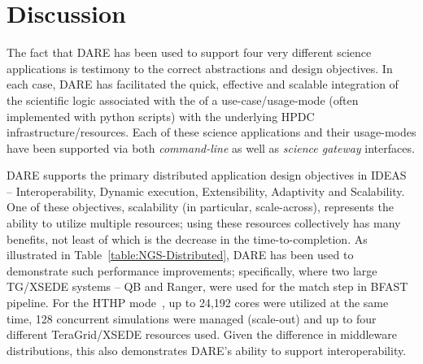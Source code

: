 \documentclass[]{svjour3}
\begin{document}
% 

\section{Discussion}

The fact that DARE has been used to support four very different
science applications is testimony to the correct abstractions and
design objectives. In each case, DARE has facilitated the quick,
effective and scalable integration of the scientific logic associated
with the of a use-case/usage-mode (often implemented with python
scripts) with the underlying HPDC infrastructure/resources. Each of
these science applications and their usage-modes have been supported
via both {\it command-line} as well as {\it science gateway}
interfaces.

DARE supports the primary distributed application design objectives in
IDEAS~\cite{ideas} -- Interoperability, Dynamic execution,
Extensibility, Adaptivity and Scalability. One of these objectives,
scalability (in particular, scale-across), represents the ability to
utilize multiple resources; using these resources collectively has
many benefits, not least of which is the decrease in the
time-to-completion. As illustrated in
Table~\ref{table:NGS-Distributed}, DARE has been used to demonstrate
such performance improvements; specifically, where two large TG/XSEDE
systems -- QB and Ranger, were used for the match step in BFAST
pipeline. For the HTHP mode~\cite{bigjob-ccgrid12}, up to 24,192 cores
were utilized at the same time, 128 concurrent simulations were
managed (scale-out) and up to four different TeraGrid/XSEDE resources
used. Given the difference in middleware distributions, this also
demonstrates DARE's ability to support interoperability.
\end{document}
